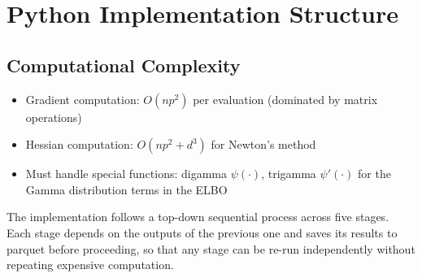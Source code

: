 \documentclass[11pt,a4paper]{article}
\begin{document}
\bigskip


\section{Python Implementation Structure}
\label{app:python-code}

\subsection*{Computational Complexity}

\begin{itemize}
\item Gradient computation: $O(np^2)$ per evaluation (dominated by matrix operations)
\item Hessian computation: $O(np^2 + d^3)$ for Newton's method
\item Must handle special functions: digamma $\psi(\cdot)$, trigamma $\psi'(\cdot)$ for the Gamma distribution terms in the ELBO
\end{itemize}

The implementation follows a top-down sequential process across five stages.
Each stage depends on the outputs of the previous one and saves its results to parquet before proceeding,
so that any stage can be re-run independently without repeating expensive computation.
\end{document}
